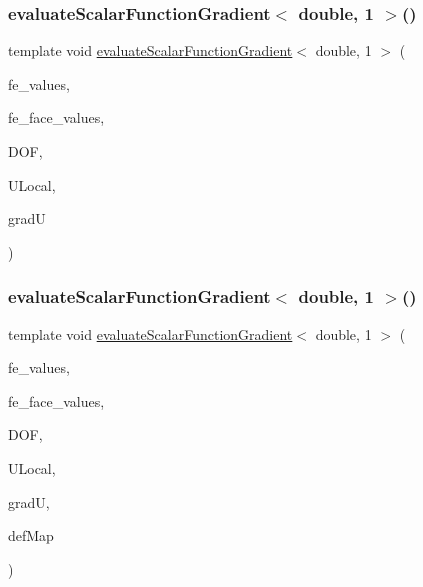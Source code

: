 \mbox{\label{function_evaluations_8cc_a91bad8776fff0a4128d167e13f9cba03}} 
\subsubsection{\texorpdfstring{evaluate\+Scalar\+Function\+Gradient$<$ double, 1 $>$()}{evaluateScalarFunctionGradient< double, 1 >()}\hspace{0.1cm}{\footnotesize\ttfamily [3/4]}}
{\footnotesize\ttfamily template void \mbox{\hyperlink{group___evaluation_functions_gabedd4ae2841d2332ed0df0513b189e34}{evaluate\+Scalar\+Function\+Gradient}}$<$ double, 1 $>$ (\begin{DoxyParamCaption}\item[{const F\+E\+Values$<$ 1 $>$ \&}]{fe\+\_\+values,  }\item[{const F\+E\+Face\+Values$<$ 1 $>$ \&}]{fe\+\_\+face\+\_\+values,  }\item[{unsigned int}]{D\+OF,  }\item[{Table$<$ 1, double $>$ \&}]{U\+Local,  }\item[{Table$<$ 2, double $>$ \&}]{gradU }\end{DoxyParamCaption})}

\mbox{\label{function_evaluations_8cc_a089c72529f691dcdbd062a644a861a93}} 
\subsubsection{\texorpdfstring{evaluate\+Scalar\+Function\+Gradient$<$ double, 1 $>$()}{evaluateScalarFunctionGradient< double, 1 >()}\hspace{0.1cm}{\footnotesize\ttfamily [4/4]}}
{\footnotesize\ttfamily template void \mbox{\hyperlink{group___evaluation_functions_gabedd4ae2841d2332ed0df0513b189e34}{evaluate\+Scalar\+Function\+Gradient}}$<$ double, 1 $>$ (\begin{DoxyParamCaption}\item[{const F\+E\+Values$<$ 1 $>$ \&}]{fe\+\_\+values,  }\item[{const F\+E\+Face\+Values$<$ 1 $>$ \&}]{fe\+\_\+face\+\_\+values,  }\item[{unsigned int}]{D\+OF,  }\item[{Table$<$ 1, double $>$ \&}]{U\+Local,  }\item[{Table$<$ 2, double $>$ \&}]{gradU,  }\item[{\mbox{\hyperlink{structdeformation_map}{deformation\+Map}}$<$ double, 1 $>$ \&}]{def\+Map }\end{DoxyParamCaption})}


